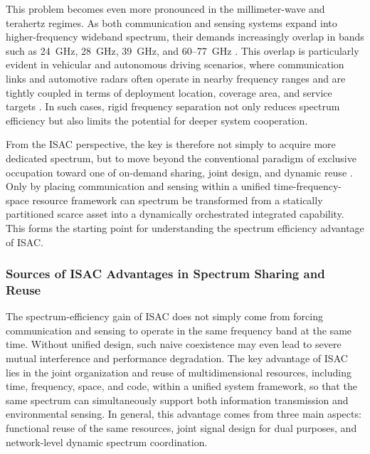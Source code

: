 This problem becomes even more pronounced in the millimeter-wave and terahertz regimes. As both communication and sensing systems expand into higher-frequency wideband spectrum, their demands increasingly overlap in bands such as 24~GHz, 28~GHz, 39~GHz, and 60--77~GHz \cite{Liu2022ISAC,Gonzalez2024integrated}. This overlap is particularly evident in vehicular and autonomous driving scenarios, where communication links and automotive radars often operate in nearby frequency ranges and are tightly coupled in terms of deployment location, coverage area, and service targets \cite{Sturm2011WaveformDesign,Kumari2018IEEE80211adRadar}. In such cases, rigid frequency separation not only reduces spectrum efficiency but also limits the potential for deeper system cooperation.

From the ISAC perspective, the key is therefore not simply to acquire more dedicated spectrum, but to move beyond the conventional paradigm of exclusive occupation toward one of on-demand sharing, joint design, and dynamic reuse \cite{Liu2020JointRadarComm,Liu2022ISAC,Gonzalez2024integrated}. Only by placing communication and sensing within a unified time-frequency-space resource framework can spectrum be transformed from a statically partitioned scarce asset into a dynamically orchestrated integrated capability. This forms the starting point for understanding the spectrum efficiency advantage of ISAC.

\subsubsection{Sources of ISAC Advantages in Spectrum Sharing and Reuse}
\label{subsubsec:ch1-adv source of isac-spectrum}

The spectrum-efficiency gain of ISAC does not simply come from forcing communication and sensing to operate in the same frequency band at the same time. Without unified design, such naive coexistence may even lead to severe mutual interference and performance degradation. The key advantage of ISAC lies in the joint organization and reuse of multidimensional resources, including time, frequency, space, and code, within a unified system framework, so that the same spectrum can simultaneously support both information transmission and environmental sensing. In general, this advantage comes from three main aspects: functional reuse of the same resources, joint signal design for dual purposes, and network-level dynamic spectrum coordination.

